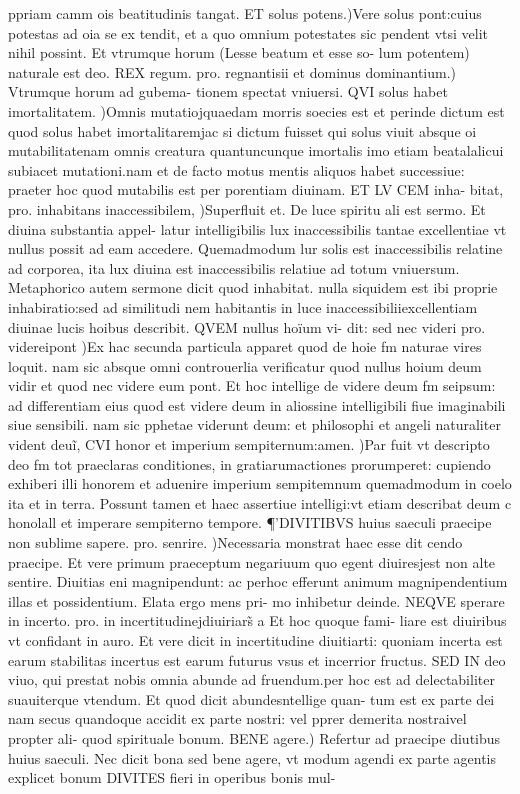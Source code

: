 \documentclass{article}
\begin{document}
\begin{pages}
ppriam camm ois beatitudinis tangat. ET solus potens.)Vere solus pont:cuius potestas ad oia se ex tendit, et a quo omnium potestates sic pendent vtsi velit nihil possint. Et vtrumque horum (Lesse beatum et esse so- lum potentem) naturale est deo. REX regum. pro. regnantisii et dominus dominantium.) Vtrumque horum ad gubema- tionem spectat vniuersi. QVI solus habet imortalitatem. )Omnis mutatiojquaedam morris soecies est et perinde dictum est quod solus habet imortalitaremjac si dictum fuisset qui solus viuit absque oi mutabilitatenam omnis creatura quantuncunque imortalis imo etiam beatalalicui subiacet mutationi.nam et de facto motus mentis aliquos habet successiue: praeter hoc quod mutabilis est per porentiam diuinam. ET LV CEM inha- bitat, pro. inhabitans inaccessibilem, )Superfluit et. De luce spiritu ali est sermo. Et diuina substantia appel- latur intelligibilis lux inaccessibilis tantae excellentiae vt nullus possit ad eam accedere. Quemadmodum lur solis est inaccessibilis relatine ad corporea, ita lux diuina est inaccessibilis relatiue ad totum vniuersum. Metaphorico autem sermone dicit quod inhabitat. nulla siquidem est ibi proprie inhabiratio:sed ad similitudi nem habitantis in luce inaccessibiliiexcellentiam diuinae lucis hoibus describit. QVEM nullus hoïum vi- dit: sed nec videri pro. videreipont )Ex hac secunda particula apparet quod de hoie fm naturae vires loquit. nam sic absque omni controuerlia verificatur quod nullus hoium deum vidir et quod nec videre eum pont. Et hoc intellige de videre deum fm seipsum: ad differentiam eius quod est videre deum in aliossine intelligibili fiue imaginabili siue sensibili. nam sic pphetae viderunt deum: et philosophi et angeli naturaliter vident deuĩ, CVI honor et imperium sempiternum:amen. )Par fuit vt descripto deo fm tot praeclaras conditiones, in gratiarumactiones prorumperet: cupiendo exhiberi illi honorem et aduenire imperium sempitemnum quemadmodum in coelo ita et in terra. Possunt tamen et haec assertiue intelligi:vt etiam describat deum c honolall et imperare sempiterno tempore.  \pend\pstart ¶’DIVITIBVS huius saeculi praecipe non sublime sapere. pro. senrire. )Necessaria monstrat haec esse dit cendo praecipe. Et vere primum praeceptum negariuum quo egent diuiresjest non alte sentire. Diuitias eni magnipendunt: ac perhoc efferunt animum magnipendentium illas et possidentium. Elata ergo mens pri- mo inhibetur deinde. NEQVE sperare in incerto. pro. in incertitudinejdiuiriars̃ a Et hoc quoque fami- liare est diuiribus vt confidant in auro. Et vere dicit in incertitudine diuitiarti: quoniam incerta est earum stabilitas incertus est earum futurus vsus et incerrior fructus. SED IN deo viuo, qui prestat nobis omnia abunde ad fruendum.per hoc est ad delectabiliter suauiterque vtendum. Et quod dicit abundesntellige quan- tum est ex parte dei nam secus quandoque accidit ex parte nostri: vel pprer demerita nostraivel propter ali- quod spirituale bonum. BENE agere.) Refertur ad praecipe diutibus huius saeculi. Nec dicit bona sed bene agere, vt modum agendi ex parte agentis explicet bonum DIVITES fieri in operibus bonis mul-  \pend
\marginpar{[ p.147 ]}

\end{pages}
\end{document}
